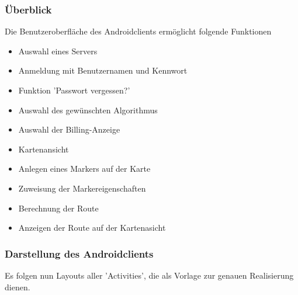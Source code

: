 \documentclass[a4paper,10pt,titlepage]{article}
\begin{document}
\subsubsection{Überblick}
Die Benutzeroberfläche des Androidclients ermöglicht folgende Funktionen
\begin{itemize}
\item Auswahl eines Servers
\item Anmeldung mit Benutzernamen und Kennwort
\item Funktion 'Passwort vergessen?'
\item Auswahl des gewünschten Algorithmus
\item Auswahl der Billing-Anzeige 
\item Kartenansicht
\item Anlegen eines Markers auf der Karte
\item Zuweisung der Markereigenschaften
\item Berechnung der Route
\item Anzeigen der Route auf der Kartenasicht
\end{itemize}

\subsubsection{Darstellung des Androidclients}
Es folgen nun Layouts aller 'Activities', die als Vorlage zur genauen Realisierung dienen.
\end{document}
